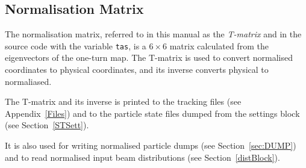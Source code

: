 \subsection{Normalisation Matrix} \label{Sec:TMatrix}

The normalisation matrix, referred to in this manual as the \emph{T-matrix} and in the source code with the variable \texttt{tas}, is a $6 \times 6$ matrix calculated from the eigenvectors of the one-turn map.
The T-matrix is used to convert normalised coordinates to physical coordinates, and its inverse converts physical to normaliased.

The T-matrix and its inverse is printed to the tracking files (see Appendix~\ref{Files}) and to the particle state files dumped from the settings block (see Section~\ref{STSett}).

It is also used for writing normalised particle dumps (see Section~\ref{sec:DUMP}) and to read normalised input beam distributions (see Section~\ref{distBlock}).
